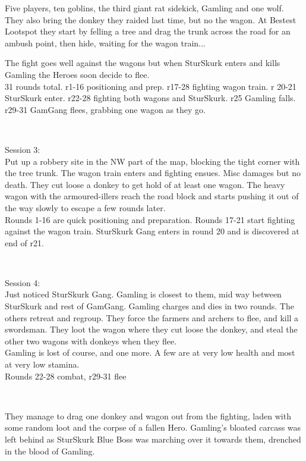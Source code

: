 Five players, ten goblins, the third giant rat sidekick, Gamling and one wolf. They also bring the donkey they raided last time, but no the wagon. At Bestest Lootspot they start by felling a tree and drag the trunk across the road for an ambush point, then hide, waiting for the wagon train...

The fight goes well against the wagons but when SturSkurk enters and kills Gamling the Heroes soon decide to flee.\\
31 rounds total. r1-16 positioning and prep. r17-28 fighting wagon train. r 20-21 SturSkurk enter. r22-28 fighting both wagons and SturSkurk. r25 Gamling falls. r29-31 GamGang flees, grabbing one wagon as they go.

\

Session 3:\\                                                            %
Put up a robbery site in the NW part of the map, blocking the tight corner with the tree trunk. The wagon train enters and fighting ensues. Misc damages but no death. They cut loose a donkey to get hold of at least one wagon. The heavy wagon with the armoured-illers reach the road block and starts pushing it out of the way slowly to escape a few rounds later.\\
Rounds 1-16 are quick positioning and preparation. Rounds 17-21 start fighting against the wagon train. SturSkurk Gang enters in round 20 and is discovered at end of r21.

\

Session 4:\\                                                            %
Just noticed SturSkurk Gang. Gamling is closest to them, mid way between SturSkurk and rest of GamGang. Gamling charges and dies in two rounds. The others retreat and regroup. They force the farmers and archers to flee, and kill a swordsman. They loot the wagon where they cut loose the donkey, and steal the other two wagons with donkeys when they flee.\\
Gamling is lost of course, and one more. A few are at very low health and most at very low stamina.\\
Rounds 22-28 combat, r29-31 flee

\

They manage to drag one donkey and wagon out from the fighting, laden with some random loot and the corpse of a fallen Hero. Gamling's bloated carcass was left behind as SturSkurk Blue Boss was marching over it towards them, drenched in the blood of Gamling.

